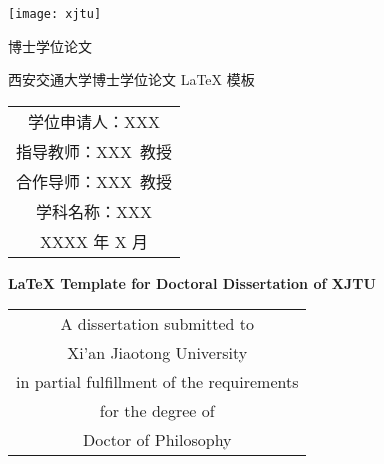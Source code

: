 
\begin{titlepage}
	\begin{center}
		\begin{figure*}[!ht]\vspace{5em}
			\centering
			\texttt{[image: xjtu]}
		\end{figure*}
		
		\vspace{1.5em}
		\begin{center} { 博士学位论文} \end{center}
		
		\vspace{8.5em}
		\begin{center} {\sanhao\hei 西安交通大学博士学位论文 \LaTeX{} 模板}\end{center}
		
		\vspace{15em}
		{\sanhao
			\begin{center} \renewcommand{\arraystretch}{1.5}
				\begin{tabular}{c}
					学位申请人：XXX \\
					指导教师：XXX~教授 \\
					合作导师：XXX~教授 \\
					学科名称：XXX \\
					XXXX 年 X 月 \\
				\end{tabular} \renewcommand{\arraystretch}{1}
			\end{center} 
		}
	\end{center}
	\clearpage{\pagestyle{empty}\cleardoublepage}
	
	\newpage\thispagestyle{empty}
	\begin{center}
		\parbox[t][0.7cm][t]{\textwidth}{}
		
		\begin{center}{\sanhao\bfseries \LaTeX{} Template for Doctoral Dissertation of XJTU}\end{center}
		
		\vspace{4.7cm}
		{\sanhao
			\begin{center} \renewcommand{\arraystretch}{1.4}
				\begin{tabular}{c}
					A dissertation submitted to  \\
					Xi'an Jiaotong University \\
					in partial fulfillment of the requirements \\
					for the degree of \\
					Doctor of Philosophy \\
				\end{tabular} \renewcommand{\arraystretch}{1}
			\end{center} 
		}
		

\end{center}
\end{titlepage}
